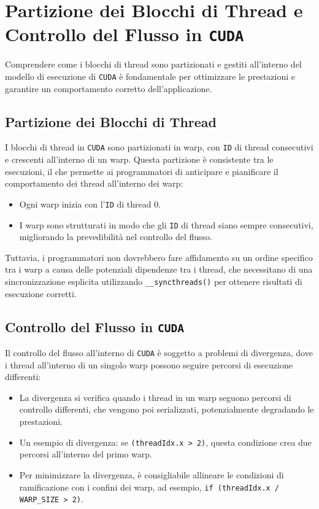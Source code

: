 \section{Partizione dei Blocchi di Thread e Controllo del Flusso
in \texttt{CUDA}}
Comprendere come i blocchi di thread sono partizionati e gestiti
all'interno del modello di esecuzione di \texttt{CUDA} è fondamentale
per ottimizzare le prestazioni e garantire un comportamento corretto
dell'applicazione.

\subsection{Partizione dei Blocchi di Thread}
I blocchi di thread in \texttt{CUDA} sono partizionati in warp,
con \texttt{ID} di thread consecutivi e crescenti all'interno di
un warp. Questa partizione è consistente tra le esecuzioni, il
che permette ai programmatori di anticipare e pianificare il
comportamento dei thread all'interno dei warp:
\begin{itemize}
    \item Ogni warp inizia con l'\texttt{ID} di thread 0.
    \item I warp sono strutturati in modo che gli \texttt{ID} di
    thread siano sempre consecutivi, migliorando la prevedibilità
    nel controllo del flusso.
\end{itemize}
Tuttavia, i programmatori non dovrebbero fare affidamento su un
ordine specifico tra i warp a causa delle potenziali dipendenze
tra i thread, che necessitano di una sincronizzazione esplicita
utilizzando \texttt{\_\_syncthreads()} per ottenere risultati di esecuzione corretti.

\subsection{Controllo del Flusso in \texttt{CUDA}}
Il controllo del flusso all'interno di \texttt{CUDA} è soggetto a
problemi di divergenza, dove i thread all'interno di un singolo warp
possono seguire percorsi di esecuzione differenti:
\begin{itemize}
    \item La divergenza si verifica quando i thread in un warp seguono
    percorsi di controllo differenti, che vengono poi serializzati,
    potenzialmente degradando le prestazioni.
    \item Un esempio di divergenza: se \texttt{(threadIdx.x > 2)},
    questa condizione crea due percorsi all'interno del primo warp.
    \item Per minimizzare la divergenza, è consigliabile allineare
    le condizioni di ramificazione con i confini dei warp, ad esempio,
    \texttt{if (threadIdx.x / WARP\_SIZE > 2)}.
\end{itemize}

